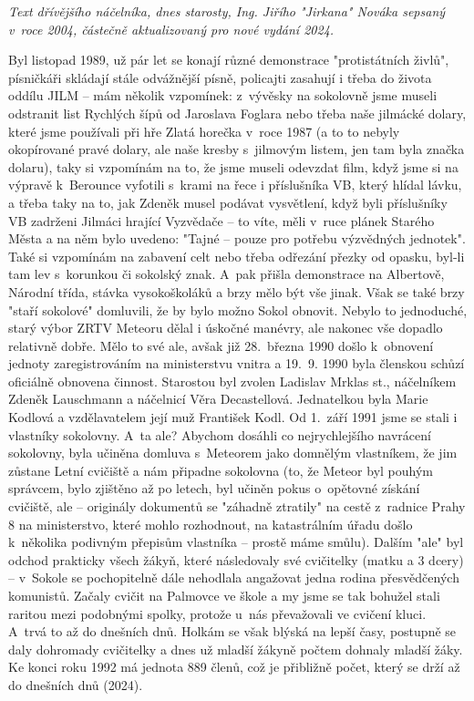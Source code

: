 \documentclass[a5paper, 11pt, twoside]{article}
\begin{document}
\begin{center}
  \textit{Text dřívějšího náčelníka, dnes starosty, Ing. Jiřího "Jirkana"
  Nováka sepsaný v~roce 2004, částečně aktualizovaný pro nové vydání
  2024.}
\end{center}

\noindent
Byl listopad 1989, už pár let se konají různé demonstrace "protistátních
živlů", písničkáři skládají stále odvážnější písně, policajti zasahují
i třeba do života oddílu JILM -- mám několik vzpomínek: z~vývěsky na
sokolovně jsme museli odstranit list Rychlých šípů od Jaroslava Foglara
nebo třeba naše jilmácké dolary, které jsme používali při hře Zlatá
horečka v~roce 1987 (a to to nebyly okopírované pravé dolary, ale naše
kresby s~jilmovým listem, jen tam byla značka dolaru), taky si vzpomínám
na to, že jsme museli odevzdat film, když jsme si na výpravě k~Berounce
vyfotili s~krami na řece i příslušníka VB, který hlídal lávku, a třeba
taky na to, jak Zdeněk musel podávat vysvětlení, když byli příslušníky
VB zadrženi Jilmáci hrající Vyzvědače -- to víte, měli v~ruce plánek
Starého Města a na něm bylo uvedeno: "Tajné -- pouze pro potřebu
výzvědných jednotek". Také si vzpomínám na zabavení celt nebo třeba
odřezání přezky od opasku, byl-li tam lev s~korunkou či sokolský znak.
A~pak přišla demonstrace na Albertově, Národní třída, stávka vysokoškoláků
a brzy mělo být vše jinak. Však se také brzy "staří sokolové"
domluvili, že by bylo možno Sokol obnovit. Nebylo to jednoduché, starý
výbor ZRTV Meteoru dělal i úskočné manévry, ale nakonec vše dopadlo
relativně dobře. Mělo to své ale, avšak již 28.~března 1990 došlo
k~obnovení jednoty zaregistrováním na ministerstvu vnitra a 19.~9. 1990
byla členskou schůzí oficiálně obnovena činnost. Starostou byl zvolen
Ladislav Mrklas st., náčelníkem Zdeněk Lauschmann a náčelnicí Věra
Decastellová. Jednatelkou byla Marie Kodlová a vzdělavatelem její muž
František Kodl. Od 1.~září 1991 jsme se stali i vlastníky sokolovny.
A~ta ale? Abychom dosáhli co nejrychlejšího navrácení sokolovny, byla
učiněna domluva s~Meteorem jako domnělým vlastníkem, že jim zůstane
Letní cvičiště a nám připadne sokolovna (to, že Meteor byl pouhým
správcem, bylo zjištěno až po letech, byl učiněn pokus o~opětovné
získání cvičiště, ale -- originály dokumentů se "záhadně ztratily" na
cestě z~radnice Prahy 8 na ministerstvo, které mohlo rozhodnout, na
katastrálním úřadu došlo k~několika podivným přepisům vlastníka --
prostě máme smůlu). Dalším "ale" byl odchod prakticky všech žákyň,
které následovaly své cvičitelky (matku a 3 dcery) -- v~Sokole se
pochopitelně dále nehodlala angažovat jedna rodina přesvědčených
komunistů. Začaly cvičit na Palmovce ve škole a my jsme se tak bohužel
stali raritou mezi podobnými spolky, protože u~nás převažovali ve
cvičení kluci. A~trvá to až do dnešních dnů. Holkám se však blýská na
lepší časy, postupně se daly dohromady cvičitelky a dnes už mladší
žákyně počtem dohnaly mladší žáky. Ke konci roku 1992 má jednota 889
členů, což je přibližně počet, který se drží až do dnešních dnů (2024).
\end{document}
